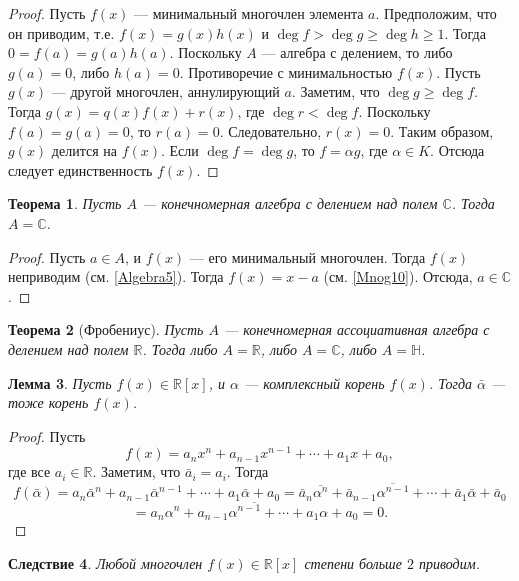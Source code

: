\documentclass[12pt, titlepage, oneside]{amsbook}
\newcommand{\HH}{\mathbb{H}}
\newcommand{\RR}{\mathbb{R}}
\newcommand{\CC}{\mathbb{C}}
\newtheorem{theorem}{Теорема}[chapter]
\newtheorem{lemma}[theorem]{Лемма}
\newtheorem{corollary}[theorem]{Следствие}
\theoremstyle{definition}
\theoremstyle{remark}
\begin{document}
\begin{proof}
	Пусть $f(x)$ --- минимальный многочлен элемента $a$. Предположим, что он приводим, т.е. $f(x)=g(x)h(x)$ и $\deg f>\deg g\geq\deg h\geq 1$. Тогда $0=f(a)=g(a)h(a)$. Поскольку $A$ --- алгебра с делением, то либо $g(a)=0$, либо $h(a)=0$. Противоречие с минимальностью $f(x)$. Пусть $g(x)$ --- другой многочлен, аннулирующий $a$. Заметим, что $\deg g\geq\deg f$. Тогда $g(x)=q(x)f(x)+r(x)$, где $\deg r<\deg f$. Поскольку $f(a)=g(a)=0$, то $r(a)=0$. Следовательно, $r(x)=0$. Таким образом, $g(x)$ делится на $f(x)$. Если $\deg f=\deg g$, то $f=\alpha g$, где $\alpha\in K$. Отсюда следует единственность $f(x)$.
\end{proof}

\begin{theorem}
	\label{Algebra6} Пусть $A$ --- конечномерная алгебра с делением над полем $\CC$. Тогда $A=\CC$.
\end{theorem}

\begin{proof}
	Пусть $a\in A$, и $f(x)$ --- его минимальный многочлен. Тогда $f(x)$ неприводим (см. \ref{Algebra5}). Тогда $f(x)=x-a$ (см. \ref{Mnog10}). Отсюда, $a\in\CC$.
\end{proof}

\begin{theorem}[Фробениус]
	\label{Algebra7} Пусть $A$ --- конечномерная ассоциативная алгебра с делением над полем $\RR$. Тогда либо $A=\RR$, либо $A=\CC$, либо $A=\HH$.
\end{theorem}

\begin{lemma}
	\label{LemMnogo1}
	Пусть $f(x)\in\RR[x]$, и $\alpha$ --- комплексный корень $f(x)$. Тогда $\bar{\alpha}$ --- тоже корень $f(x)$.
\end{lemma}

\begin{proof}
	Пусть $$f(x)=a_nx^n+a_{n-1}x^{n-1}+\cdots+a_1x+a_0,$$ где все $a_i\in\RR$. Заметим, что $\bar{a}_i=a_i$. Тогда $$f(\bar{\alpha})=a_n\bar{\alpha}^n+a_{n-1}\bar{\alpha}^{n-1}+\cdots+a_1\bar{\alpha}+a_0=\bar{a}_n\overline{\alpha^n}+\bar{a}_{n-1}\overline{\alpha^{n-1}}+\cdots+\bar{a}_1\bar{\alpha}+\bar{a}_0$$ $$=\overline{a_n\alpha^n+a_{n-1}\alpha^{n-1}+\cdots+a_1\alpha+a_0}=0.$$
\end{proof}

\begin{corollary}
	\label{LemMnogo2}
	Любой многочлен $f(x)\in\RR[x]$ степени больше $2$ приводим.
\end{corollary}
\end{document}
